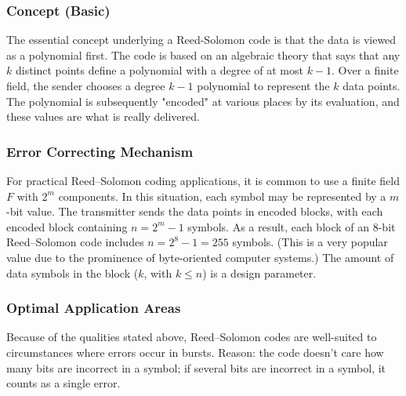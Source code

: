 \documentclass[10pt,twocolumn,letterpaper]{article}
\begin{document}
\subsubsection{Concept (Basic)}

The essential concept underlying a Reed-Solomon code is that the data is viewed as a polynomial first. The code is based on an algebraic theory that says that any $k$ distinct points define a polynomial with a degree of at most $k-1$.
Over a finite field, the sender chooses a degree $k-1$ polynomial to represent the  $k$ data points. The polynomial is subsequently "encoded" at various places by its evaluation, and these values are what is really delivered.

\subsubsection{Error Correcting Mechanism}
For practical Reed–Solomon coding applications, it is common to use a finite field $F$ with $2^m$ components. In this situation, each symbol may be represented by a $m$-bit value. The transmitter sends the data points in encoded blocks, with each encoded block containing $n=2^m-1$ symbols.
As a result, each block of an $8$-bit Reed–Solomon code includes $n=2^8-1=255$ symbols. (This is a very popular value due to the prominence of byte-oriented computer systems.) The amount of data symbols in the block ($k$, with $k \leq n$) is a design parameter.

\subsubsection{Optimal Application Areas}
Because of the qualities stated above, Reed–Solomon codes are well-suited to circumstances where errors occur in bursts. Reason: the code doesn't care how many bits are incorrect in a symbol; if several bits are incorrect in a symbol, it counts as a single error.

\newpage
\onecolumn
\end{document}

